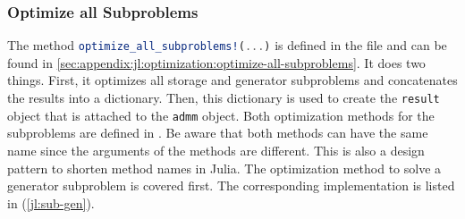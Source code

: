 \subsubsection*{Optimize all Subproblems}

The method \lstinline[language=julia]{optimize_all_subproblems!(...)} is defined in the file  and can be found in \ref{sec:appendix:jl:optimization:optimize-all-subproblems}. It does two things. First, it optimizes all storage and generator subproblems and concatenates the results into a dictionary. Then, this dictionary is used to create the \lstinline[language=julia]{result} object that is attached to the \lstinline[language=julia]{admm} object. Both optimization methods for the subproblems are defined in . Be aware that both methods can have the same name since the arguments of the methods are different. This is also a design pattern to shorten method names in Julia. The optimization method to solve a generator subproblem is covered first. The corresponding implementation is listed in (\ref{jl:sub-gen}).




